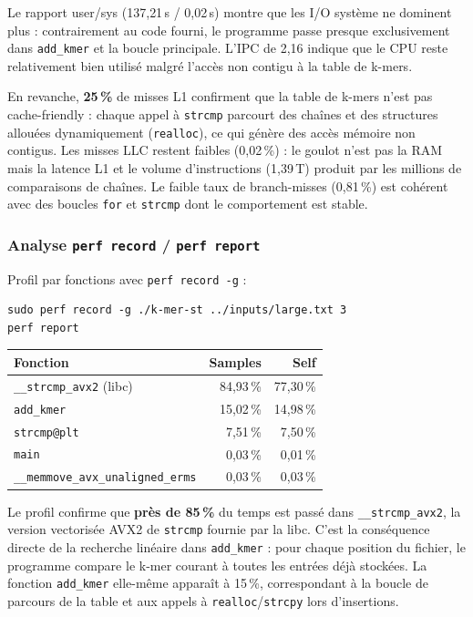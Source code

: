 \documentclass[a4paper,12pt]{article}
\begin{document}
Le rapport user/sys (137{,}21\,s / 0{,}02\,s) montre que les I/O système ne dominent plus : contrairement au code fourni, le programme passe presque exclusivement dans \texttt{add\_kmer} et la boucle principale. L'IPC de 2{,}16 indique que le CPU reste relativement bien utilisé malgré l'accès non contigu à la table de k-mers.

En revanche, \textbf{25\,\%} de misses L1 confirment que la table de k-mers n'est pas cache-friendly : chaque appel à \texttt{strcmp} parcourt des chaînes et des structures allouées dynamiquement (\texttt{realloc}), ce qui génère des accès mémoire non contigus. Les misses LLC restent faibles (0{,}02\,\%) : le goulot n'est pas la RAM mais la latence L1 et le volume d'instructions (1{,}39\,T) produit par les millions de comparaisons de chaînes. Le faible taux de branch-misses (0{,}81\,\%) est cohérent avec des boucles \texttt{for} et \texttt{strcmp} dont le comportement est stable.

\subsubsection{Analyse \texttt{perf record} / \texttt{perf report}}

Profil par fonctions avec \texttt{perf record -g} :

\begin{verbatim}
sudo perf record -g ./k-mer-st ../inputs/large.txt 3
perf report
\end{verbatim}

\begin{center}
\begin{tabular}{|l|r|r|}
\hline
Fonction & Samples & Self \\
\hline
\texttt{\_\_strcmp\_avx2} (libc) & 84{,}93\,\% & 77{,}30\,\% \\
\texttt{add\_kmer} & 15{,}02\,\% & 14{,}98\,\% \\
\texttt{strcmp@plt} & 7{,}51\,\% & 7{,}50\,\% \\
\texttt{main} & 0{,}03\,\% & 0{,}01\,\% \\
\texttt{\_\_memmove\_avx\_unaligned\_erms} & 0{,}03\,\% & 0{,}03\,\% \\
\hline
\end{tabular}
\end{center}

Le profil confirme que \textbf{près de 85\,\%} du temps est passé dans \texttt{\_\_strcmp\_avx2}, la version vectorisée AVX2 de \texttt{strcmp} fournie par la libc. C'est la conséquence directe de la recherche linéaire dans \texttt{add\_kmer} : pour chaque position du fichier, le programme compare le k-mer courant à toutes les entrées déjà stockées. La fonction \texttt{add\_kmer} elle-même apparaît à 15\,\%, correspondant à la boucle de parcours de la table et aux appels à \texttt{realloc}/\texttt{strcpy} lors d'insertions.
\end{document}
